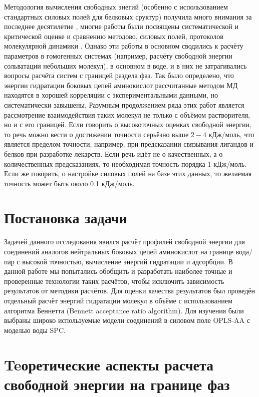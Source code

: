 Методология вычисления свободных энегий (особенно с использованием стандартных силовых полей для белковых сруктур) получила много внимания за последнее десятилетие \cite{chipot_2002}, многие работы были посвящены систематической и критической оценке и сравнению методово, силовых полей, протоколов молекулярной динамики \cite{fee_maccalum_2003,fee_villa_2002,bar_comp,comp_fe_meth_2006,fee_hess_2006,fee_mobley_2007,shirts_waterff,shirts_proteinff,shirts_theory}. Однако эти работы в основном сводились к расчёту параметров в гомогенных системах (например, расчёту свободной энергии сольватации небольших молекул), в основном в воде, и в них не затрагивались вопросы расчёта систем с границей раздела фаз. Так было определено, что энергии гидратации боковых цепей аминокислот рассчитанные методом МД находятся в хорошей
 корреляции с экспериментальными данными, но систематически завышены. Разумным продолжением ряда этих работ является рассмотрение взаимодействия таких молекул не только с объёмом растворителя, но и с его границей. Если говорить о высокоточных оценках свободной энергии, то речь можно вести о достижении точности серьёзно выше $2 - 4$ кДж/моль, что является пределом точности, например, при предсказании связывания лигандов и белков при разработке лекарств. Если речь идёт не о качественных, а о количественных предсказаниях, то необходимая точность порядка 1 кДж/моль. Если же говорить, о настройке силовых полей на базе этих данных, то желаемая точность может быть около 0.1 кДж/моль.

\section{Постановка задачи}
Задачей данного исследования явился расчёт профилей свободной энергии для соединений аналогов нейтральных боковых цепей аминокислот на границе вода/пар с высокой точностью, вычисление энергий гидратации и адсорбции. В данной работе мы попытались обобщить и разработать наиболее точные и проверенные технологии таких расчётов, чтобы исключить зависимость результатов от методики расчётов. Для оценки качества результатов был проведён отдельный расчёт энергий гидратации молекул в объёме с использованием алгоритма Беннетта (Bennett acceptance ratio algorithm).
Для изучения были выбраны широко используемые модели соединений в силовом поле OPLS-AA \cite{opls-aa} с моделью воды  SPC.



\section{Teоретические аспекты расчета свободной энергии на границе фаз}
